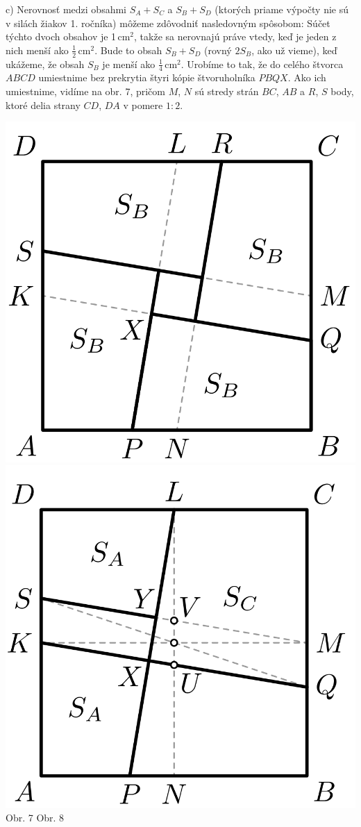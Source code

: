 \documentclass[11pt,a4paper,oneside,final]{book}
\begin{document}
c) Nerovnosť medzi obsahmi $S_A + S_C$ a $S_B + S_D$ (ktorých priame výpočty nie sú v silách žiakov 1. ročníka) môžeme zdôvodniť nasledovným spôsobom: Súčet týchto dvoch obsahov je 1\,cm$^2$, takže sa nerovnajú práve vtedy, keď je jeden z nich menší ako $\frac{1}{2}$\,cm$^2$. Bude to obsah $S_B +S_D$ (rovný $2S_B$, ako už vieme), keď ukážeme, že obsah $S_B$ je menší ako $\frac{1}{4}$\,cm$^2$. Urobíme to tak, že do celého štvorca $ABCD$ umiestnime bez prekrytia štyri kópie štvoruholníka $PBQX$. Ako ich umiestnime, vidíme na obr. 7, pričom $M$, $N$ sú stredy strán $BC$, $AB$ a $R$, $S$ body, ktoré delia strany $CD$, $DA$ v pomere $1 : 2$.
\begin{center}
\includegraphics{60D32} \includegraphics{60D33}\\

Obr. 7 \hspace{140pt} Obr. 8
\end{center}
\end{document}
